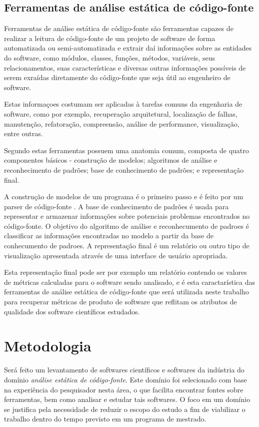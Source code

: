 \documentclass[qual, classic, a4paper]{ufbathesis}
\begin{document}
\section{Ferramentas de análise estática de código-fonte}

Ferramentas de análise estática de código-fonte são ferramentas capazes de
realizar a leitura de código-fonte de um projeto de software de forma
automatizada ou semi-automatizada e extrair daí informações sobre as entidades
do software, como módulos, classes, funções, métodos, variáveis, seus
relacionamentos, suas características e diversas outras informações possíveis
de serem exraídas diretamente do código-fonte que seja útil ao engenheiro de
software.

Estas informaçoes costumam ser aplicadas à tarefas comuns da engenharia de
software, como por exemplo, recuperação arquitetural, localização de falhas,
manutenção, refatoração, compreensão, análise de performance, visualização,
entre outras.

Segundo  estas ferramentas possuem uma
anatomia comum, composta de quatro componentes básicos - construção de
modelos; algoritmos de análise e reconhecimento de padrões; base de
conhecimento de padrões; e representação final.

A construção de modelos de um programa é o primeiro passo e é feito por um
parser de código-fonte \cite{Binkley2007}. A base de conhecimento de padrões é
usada para representar e armazenar informações sobre potenciais problemas
encontrados no código-fonte. O objetivo do algoritmo de análise e
reconhecumento de padroes é classificar as informações encontradas no modelo a
partir da base de conhecumento de padroes. A representação final é um
relatório ou outro tipo de visualização apresentada através de uma interface
de usuário apropriada.

Esta representação final pode ser por exemplo um relatório contendo os valores
de métricas calculadas para o software sendo analisado, e é esta
caractarística das ferramentas de análise estática de código-fonte que será
utilizada neste trabalho para recuperar métricas de produto de software que
reflitam os atributos de qualidade dos software científicos estudados.

\chapter{Metodologia}

Será feito um levantamento de softwares científicos e softwares
da indústria do domínio {\it análise estática de código-fonte}. Este domínio
foi selecionado com base na experiência do pesquisador nesta área, o que
facilita encontrar fontes sobre ferramentas, bem como analisar e estudar
tais softwares. O foco em um domínio se justifica pela necessidade de reduzir
o escopo do estudo a fim de viabilizar o trabalho dentro do tempo previsto em
um programa de mestrado.
\end{document}
